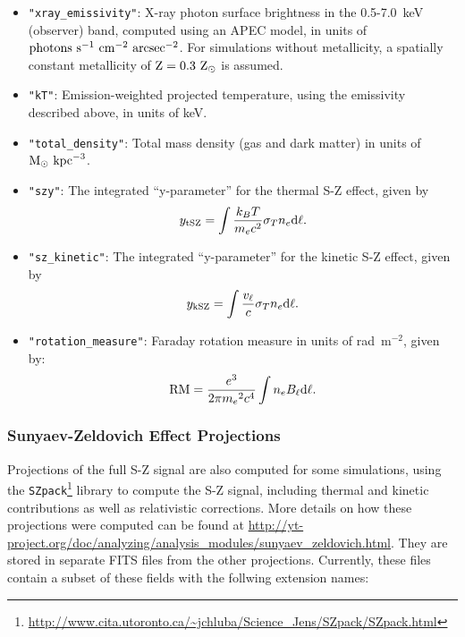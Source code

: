 \documentclass{emulateapj}
\newcommand{\code}[1]{\texttt{#1}}
\begin{document}
\begin{itemize}
\item \code{"xray\_emissivity"}: X-ray photon surface brightness in the 0.5-7.0~keV (observer) band, computed using an APEC model, in units of ${\rm photons~s^{-1}~{cm}^{-2}~{arcsec}^{-2}}$. For simulations without metallicity, a spatially constant metallicity of ${\rm Z = 0.3~Z_\odot}$ is assumed.
\item \code{"kT"}: Emission-weighted projected temperature, using the emissivity described above, in units of keV.
\item \code{"total\_density"}: Total mass density (gas and dark matter) in units of $\rm{M_\odot~{kpc}^{-3}}$.
\item \code{"szy"}: The integrated ``y-parameter'' for the thermal S-Z effect, given by
\begin{equation}
y_{\rm tSZ} = \int{\frac{k_BT}{m_e{c^2}}\sigma_T{n_e}{\rm d\ell}}.
\end{equation}
\item \code{"sz\_kinetic"}: The integrated ``y-parameter'' for the kinetic S-Z effect, given by
\begin{equation}
y_{\rm kSZ} = \int{\frac{v_\ell}{c}\sigma_T{n_e}{\rm d\ell}}.
\end{equation}
\item \code{"rotation\_measure"}: Faraday rotation measure in units of rad~m$^{-2}$, given by:
\begin{equation}
{\rm RM} = \frac{e^3}{2\pi{m_e}^2c^4}\int{n_e}{B_{\ell}}{\rm d}{\ell}.
\end{equation}
\end{itemize}

\subsubsection{Sunyaev-Zeldovich Effect Projections}\label{sec:sz}

Projections of the full S-Z signal are also computed for some simulations, using the \code{SZpack}\footnote{\url{http://www.cita.utoronto.ca/~jchluba/Science_Jens/SZpack/SZpack.html}} library \citep{chl12, chl13} to compute the S-Z signal, including thermal and kinetic contributions as well as relativistic corrections. More details on how these projections were computed can be found at \url{http://yt-project.org/doc/analyzing/analysis_modules/sunyaev_zeldovich.html}. They are stored in separate FITS files from the other projections. Currently, these files contain a subset of these fields with the follwing extension names:
\end{document}
